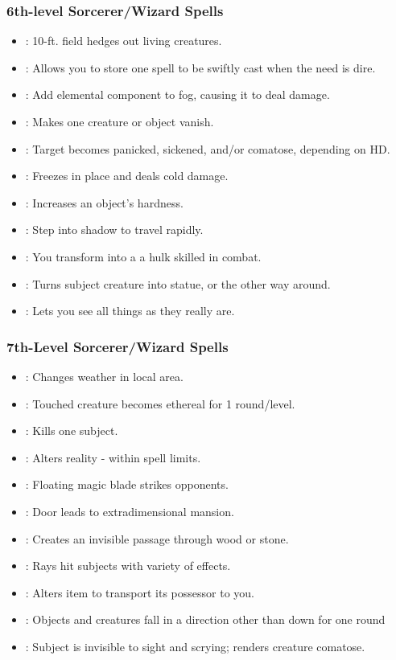 \subsubsection{6th-level Sorcerer/Wizard Spells}
\begin{itemize}
\item {}: 10-ft. field hedges out living creatures.
\item {}: Allows you to store one spell to be swiftly cast when the need is dire.
\item {}: Add elemental component to fog, causing it to deal damage.
\item {}: Makes one creature or object vanish.
\item {}: Target becomes panicked, sickened, and/or comatose, depending on HD.
\item {}: Freezes in place and deals cold damage.
\item {}: Increases an object's hardness.
\item {}: Step into shadow to travel rapidly.
\item {}: You transform into a a hulk skilled in combat.
\item {}: Turns subject creature into statue, or the other way around.
\item {}: Lets you see all things as they really are.
\end{itemize}
\subsubsection{7th-Level Sorcerer/Wizard Spells}
\begin{itemize}
\item {}: Changes weather in local area.
\item {}: Touched creature becomes ethereal for 1 round/level.
\item {}: Kills one subject.
\item {}: Alters reality - within spell limits.
\item {}: Floating magic blade strikes opponents.
\item {}: Door leads to extradimensional mansion.
\item {}: Creates an invisible passage through wood or stone.
\item {}: Rays hit subjects with variety of effects.
\item {}: Alters item to transport its possessor to you.
\item {}: Objects and creatures fall in a direction other than down for one round
\item {}: Subject is invisible to sight and scrying; renders creature comatose.
\end{itemize}

